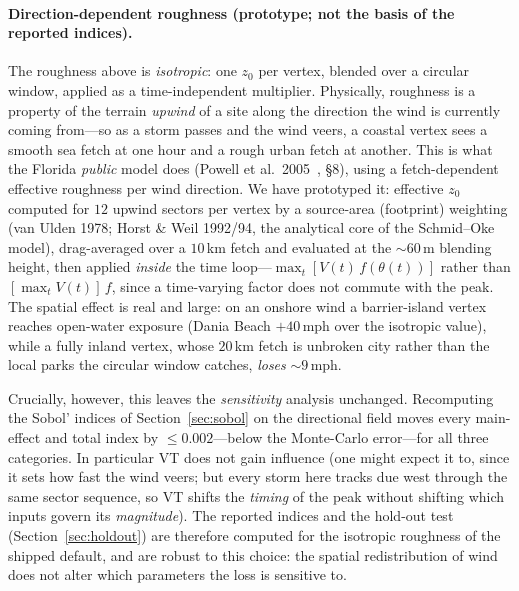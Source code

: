 \documentclass[11pt]{article}
\begin{document}
\paragraph{Direction-dependent roughness (prototype; not the basis of the reported
indices).} The roughness above is \emph{isotropic}: one $z_0$ per vertex, blended over a
circular window, applied as a time-independent multiplier. Physically, roughness is a
property of the terrain \emph{upwind} of a site along the direction the wind is currently
coming from---so as a storm passes and the wind veers, a coastal vertex sees a smooth sea
fetch at one hour and a rough urban fetch at another. This is what the Florida
\emph{public} model does (Powell et al.\ 2005~\cite{powell2005}, §8), using a
fetch-dependent effective roughness per wind direction. We have prototyped it: effective
$z_0$ computed for $12$ upwind sectors per vertex by a source-area (footprint) weighting
(van Ulden 1978; Horst \& Weil 1992/94, the analytical core of the Schmid--Oke model),
drag-averaged over a $10$\,km fetch and evaluated at the $\sim\!60$\,m blending height,
then applied \emph{inside} the time loop---$\max_t[V(t)\,f(\theta(t))]$ rather than
$[\max_t V(t)]\,f$, since a time-varying factor does not commute with the peak. The
spatial effect is real and large: on an onshore wind a barrier-island vertex reaches
open-water exposure (Dania Beach $+40$\,mph over the isotropic value), while a fully
inland vertex, whose $20$\,km fetch is unbroken city rather than the local parks the
circular window catches, \emph{loses} $\sim\!9$\,mph.

Crucially, however, this leaves the \emph{sensitivity} analysis unchanged. Recomputing
the Sobol' indices of Section~\ref{sec:sobol} on the directional field moves every
main-effect and total index by $\le 0.002$---below the Monte-Carlo error---for all three
categories. In particular VT does not gain influence (one might expect it to, since it
sets how fast the wind veers; but every storm here tracks due west through the same
sector sequence, so VT shifts the \emph{timing} of the peak without shifting which inputs
govern its \emph{magnitude}). The reported indices and the hold-out test
(Section~\ref{sec:holdout}) are therefore computed for the isotropic roughness of the
shipped default, and are robust to this choice: the spatial redistribution of wind does
not alter which parameters the loss is sensitive to.
\end{document}

